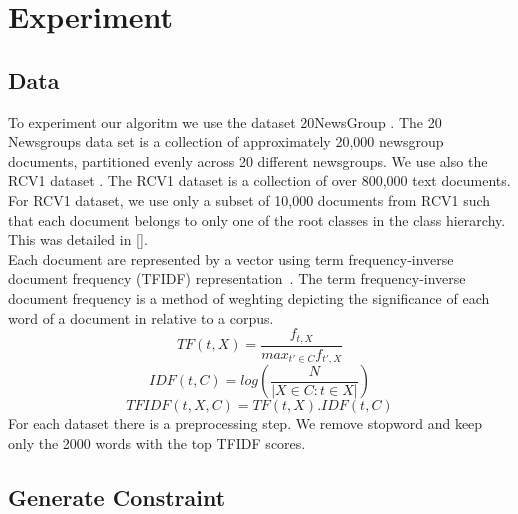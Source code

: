 \section{Experiment}

\subsection{Data}
To experiment our algoritm we use the dataset 20NewsGroup \cite{Newsgroups20}.
The 20 Newsgroups data set is a collection of approximately 20,000 newsgroup 
documents, partitioned evenly across 20 different newsgroups. We use also the 
RCV1 dataset \cite{Lewis:2004:RNB:1005332.1005345}. The RCV1 dataset is a 
collection of over 800,000 text documents. For RCV1 dataset, we use only a 
subset of 10,000 documents from RCV1 such that each document belongs to only 
one of the root classes in the class hierarchy. This was detailed in 
[\cite{Deap-K-Means}].\\
Each document are represented by a vector using term frequency-inverse document 
frequency (TFIDF) representation~\cite{doi:10.1108/eb026526}.
The term frequency-inverse document frequency is a method of weghting depicting 
the significance of each word of a document in relative to a corpus.
\begin{equation}
TF(t, X) = \frac{f_{t, X}}{max_{t' \in C}f_{t', X}} 
\end{equation}
\begin{equation}
IDF(t, C) = log(\frac{N}{|X \in C : t \in X|})
\end{equation}
\begin{equation}
TFIDF(t,X,C) = TF(t, X) . IDF(t, C)   
\end{equation}
For each dataset there is a preprocessing step. We remove stopword and keep only
the 2000 words with the top TFIDF scores. 
\subsection{Generate Constraint}
